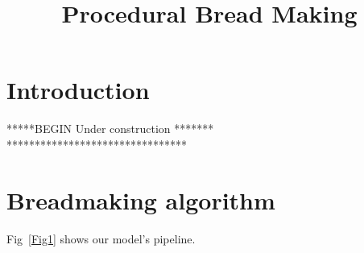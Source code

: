 \documentclass[final,5p,times]{elsarticle}
\begin{document}
\begin{frontmatter}



\title{Procedural Bread Making}


\author{}

\address{}

\begin{abstract}

\end{abstract}

\begin{keyword}


\end{keyword}

\end{frontmatter}

\linenumbers

\section{Introduction}


*****BEGIN Under construction *******\\
********************************
\section{Breadmaking algorithm}
Fig~\ref{Fig1} shows our model's  pipeline.
\end{document}
